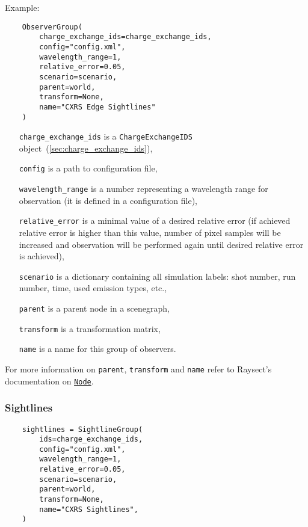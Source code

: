 \documentclass[../main.tex]{subfiles}
\begin{document}
Example:
\begin{verbatim}
    ObserverGroup(
        charge_exchange_ids=charge_exchange_ids,
        config="config.xml",
        wavelength_range=1,
        relative_error=0.05,
        scenario=scenario,
        parent=world,
        transform=None,
        name="CXRS Edge Sightlines"
    )
\end{verbatim}

\begin{itemize}[align=left]
    \item[\texttt{charge\_exchange\_ids}] is a \texttt{ChargeExchangeIDS} object~(\cref{sec:charge_exchange_ids}),
    \item[\texttt{config}] is a path to configuration file,
    \item[\texttt{wavelength\_range}] is a number representing a wavelength range for observation (it is defined in a configuration file),
    \item[\texttt{relative\_error}] is a minimal value of a desired relative error (if achieved relative error is higher than this value, number of pixel samples will be increased and observation will be performed again until desired relative error is achieved),
    \item[\texttt{scenario}] is a dictionary containing all simulation labels: shot number, run number, time, used emission types, etc.,
    \item[\texttt{parent}] is a parent node in a scenegraph,
    \item[\texttt{transform}] is a transformation matrix,
    \item[\texttt{name}] is a name for this group of observers.
\end{itemize}

For more information on \texttt{parent}, \texttt{transform} and \texttt{name} refer to Raysect's documentation on \href{https://raysect.github.io/documentation/api_reference/edge/raysect_edge_scenegraph.html?highlight=node#raysect.edge.scenegraph.node.Node}{\texttt{Node}}.

\subsubsection{Sightlines}%
\label{sec:sightlines}

\begin{verbatim}
    sightlines = SightlineGroup(
        ids=charge_exchange_ids,
        config="config.xml",
        wavelength_range=1,
        relative_error=0.05,
        scenario=scenario,
        parent=world,
        transform=None,
        name="CXRS Sightlines",
    )
\end{verbatim}
\end{document}
